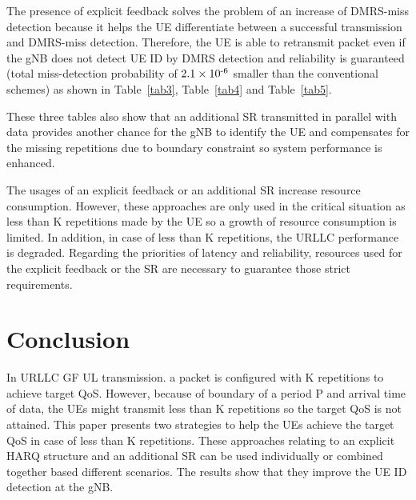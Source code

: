 \documentclass[conference]{IEEEtran}
\begin{document}
The presence of explicit feedback solves the problem of an increase of DMRS-miss detection because it helps the UE differentiate between a successful transmission and DMRS-miss detection. Therefore, the UE is able to retransmit packet even if the gNB does not detect UE ID by DMRS detection and reliability is guaranteed (total miss-detection probability of $2.1\times10\textsuperscript{-6}$ smaller than the conventional schemes) as shown in Table~\ref{tab3}, Table~\ref{tab4} and Table~\ref{tab5}.

These three tables also show that an additional SR transmitted in parallel with data provides another chance for the gNB to identify the UE and compensates for the missing repetitions due to boundary constraint so system performance is enhanced. 

The usages of an explicit feedback or an additional SR increase resource consumption. However, these approaches are only used in the critical situation as less than K repetitions made by the UE so a growth of resource consumption is limited. In addition, in case of less than K repetitions, the URLLC performance is degraded. Regarding the priorities of latency and reliability, resources used for the explicit feedback or the SR are necessary to guarantee those strict requirements.

\section{Conclusion}\label{V}

In URLLC GF UL transmission. a packet is configured with K repetitions to achieve target QoS. However, because of boundary of a period P and arrival time of data, the UEs might transmit less than K repetitions so the target QoS is not attained. This paper presents two strategies to help the UEs achieve the target QoS in case of less than K repetitions. These approaches relating to an explicit HARQ structure and an additional SR can be used individually or combined together based different scenarios. The results show that they improve the UE ID detection at the gNB.
\end{document}
